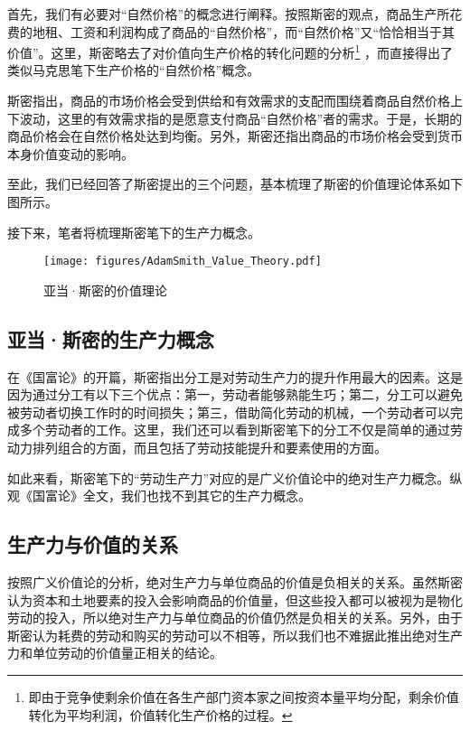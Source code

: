 首先，我们有必要对“自然价格”的概念进行阐释。按照斯密的观点，商品生产所花费的地租、工资和利润构成了商品的“自然价格”，而“自然价格”又“恰恰相当于其价值”\cite[49]{YaDang*SiMiGuoFuLun2015}。这里，斯密略去了对价值向生产价格的转化问题的分析\footnote{即由于竞争使剩余价值在各生产部门资本家之间按资本量平均分配，剩余价值转化为平均利润，价值转化生产价格的过程\cite{XieFuShengXiFangXueZheGuanYuMaKeSiJieZhiZhuanXingLiLunYanJiuShuPing2000}。}
，而直接得出了类似马克思笔下生产价格的“自然价格”概念。

斯密指出，商品的市场价格会受到供给和有效需求的支配而围绕着商品自然价格上下波动，这里的有效需求指的是愿意支付商品“自然价格”者的需求\cite[50]{YaDang*SiMiGuoFuLun2015}。于是，长期的商品价格会在自然价格处达到均衡\cite[50]{YaDang*SiMiGuoFuLun2015}。另外，斯密还指出商品的市场价格会受到货币本身价值变动的影响\cite[28-31]{YaDang*SiMiGuoFuLun2015}。

至此，我们已经回答了斯密提出的三个问题，基本梳理了斯密的价值理论体系如下图所示。

接下来，笔者将梳理斯密笔下的生产力概念。

\begin{figure}
    \centering
    \caption{亚当·斯密的价值理论}
    \label{figures:AdamSmith_Value_Theory}
    \texttt{[image: figures/AdamSmith\_Value\_Theory.pdf]}
\end{figure}

\subsection{亚当·斯密的生产力概念}

在《国富论》的开篇，斯密指出分工是对劳动生产力的提升作用最大的因素\cite[3]{YaDang*SiMiGuoFuLun2015}。这是因为通过分工有以下三个优点：第一，劳动者能够熟能生巧；第二，分工可以避免被劳动者切换工作时的时间损失；第三，借助简化劳动的机械，一个劳动者可以完成多个劳动者的工作。\cite[6]{YaDang*SiMiGuoFuLun2015}这里，我们还可以看到斯密笔下的分工不仅是简单的通过劳动力排列组合的方面，而且包括了劳动技能提升和要素使用的方面。

如此来看，斯密笔下的“劳动生产力”对应的是广义价值论中的绝对生产力概念。纵观《国富论》全文，我们也找不到其它的生产力概念。

\subsection{生产力与价值的关系}

按照广义价值论的分析，绝对生产力与单位商品的价值是负相关的关系。虽然斯密认为资本和土地要素的投入会影响商品的价值量，但这些投入都可以被视为是物化劳动的投入，所以绝对生产力与单位商品的价值仍然是负相关的关系。另外，由于斯密认为耗费的劳动和购买的劳动可以不相等，所以我们也不难据此推出绝对生产力和单位劳动的价值量正相关的结论。


